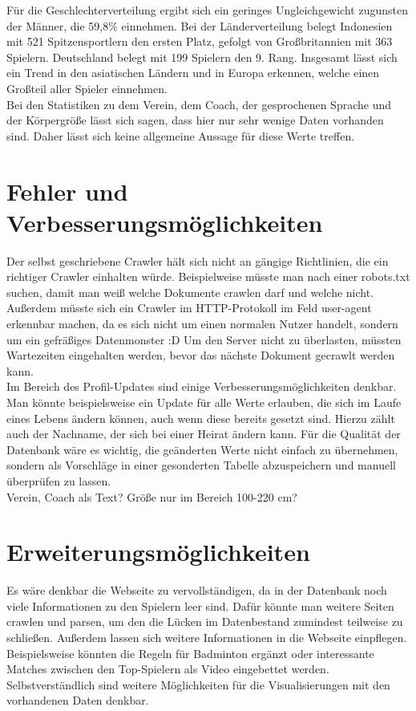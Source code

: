 \documentclass[12pt,a4paper]{scrreprt}
\begin{document}
Für die Geschlechterverteilung ergibt sich ein geringes Ungleichgewicht zugunsten der Männer, die 59,8\% einnehmen. Bei der Länderverteilung belegt Indonesien mit 521 Spitzensportlern den ersten Platz, gefolgt von Großbritannien mit 363 Spielern. Deutschland belegt mit 199 Spielern den 9. Rang. Insgesamt lässt sich ein Trend in den asiatischen Ländern und in Europa erkennen, welche einen Großteil aller Spieler einnehmen.\\

Bei den Statistiken zu dem Verein, dem Coach, der gesprochenen Sprache und der Körpergröße lässt sich sagen, dass hier nur sehr wenige Daten vorhanden sind. Daher lässt sich keine allgemeine Aussage für diese Werte treffen.

\section{Fehler und Verbesserungsmöglichkeiten}
Der selbst geschriebene Crawler hält sich nicht an gängige Richtlinien, die ein \glqq richtiger\grqq{} Crawler einhalten würde. Beispielweise müsste man nach einer \glqq robots.txt\grqq{} suchen, damit man weiß welche Dokumente crawlen darf und welche nicht. Außerdem müsste sich ein Crawler im HTTP-Protokoll im Feld \glqq user-agent\grqq{} erkennbar machen, da es sich nicht um einen normalen Nutzer handelt, sondern um ein gefräßiges Datenmonster :D Um den Server nicht zu überlasten, müssten Wartezeiten eingehalten werden, bevor das nächste Dokument gecrawlt werden kann.\\

Im Bereich des Profil-Updates sind einige Verbesserungsmöglichkeiten denkbar. Man könnte beispielsweise ein Update für alle Werte erlauben, die sich im Laufe eines Lebens ändern können, auch wenn diese bereits gesetzt sind. Hierzu zählt auch der Nachname, der sich bei einer Heirat ändern kann. Für die Qualität der Datenbank wäre es wichtig, die geänderten Werte nicht einfach zu übernehmen, sondern als Vorschläge in einer gesonderten Tabelle abzuspeichern und manuell überprüfen zu lassen.\\

Verein, Coach als Text? Größe nur im Bereich 100-220 cm?

\section{Erweiterungsmöglichkeiten}
Es wäre denkbar die Webseite zu \glqq vervollständigen\grqq, da in der Datenbank noch viele Informationen zu den Spielern leer sind. Dafür könnte man weitere Seiten crawlen und parsen, um den die Lücken im Datenbestand zumindest teilweise zu schließen. Außerdem lassen sich weitere Informationen in die Webseite einpflegen. Beispielsweise könnten die Regeln für Badminton ergänzt oder interessante Matches zwischen den Top-Spielern als Video eingebettet werden. Selbstverständlich sind weitere Möglichkeiten für die Visualisierungen mit den vorhandenen Daten denkbar.
\end{document}
